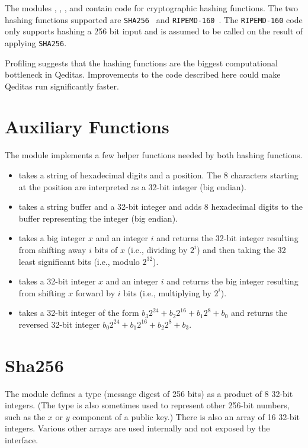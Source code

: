 The modules {}, {}, {}, {}
and {} contain code for cryptographic hashing functions.
The two hashing functions supported are {\tt{SHA256}}~\cite{sha256} and {\tt{RIPEMD-160}}~\cite{ripemd160}.
The {\tt{RIPEMD-160}} code only supports hashing a 256 bit input and is
assumed to be called on the result of applying {\tt{SHA256}}.

Profiling suggests that the hashing functions are the biggest computational bottleneck
in Qeditas. Improvements to the code described here could make Qeditas run significantly faster.

\section{Auxiliary Functions}

The module {} implements a few helper functions needed by both hashing functions.
\begin{itemize}
\item {} takes a string of hexadecimal digits and a position. The 8 characters starting at the position are interpreted as a 32-bit integer (big endian).
\item {} takes a string buffer and a 32-bit integer and adds 8 hexadecimal digits to the buffer representing the integer (big endian).
\item {} takes a big integer $x$ and an integer $i$ and returns the 32-bit integer resulting from shifting away $i$ bits of $x$ (i.e., dividing by $2^i$) and then taking the 32 least significant bits (i.e., modulo $2^{32}$).
\item {} takes a 32-bit integer $x$ and an integer $i$ and returns the big integer resulting from shifting $x$ forward by $i$ bits (i.e., multiplying by $2^i$).
\item {} takes a 32-bit integer of the form $b_3 2^{24} + b_2 2^{16} + b_1 2^{8} + b_0$
and returns the reversed 32-bit integer $b_0 2^{24} + b_1 2^{16} + b_2 2^{8} + b_3$.
\end{itemize}

\section{Sha256}

The module {} defines a type {} (message digest of 256 bits)
as a product of 8 32-bit integers.
(The type {} is also sometimes used to represent other 256-bit numbers, such as the
$x$ or $y$ component of a public key.)
There is also an array {} of 16 32-bit integers.
Various other arrays are used internally and not exposed by the interface.

